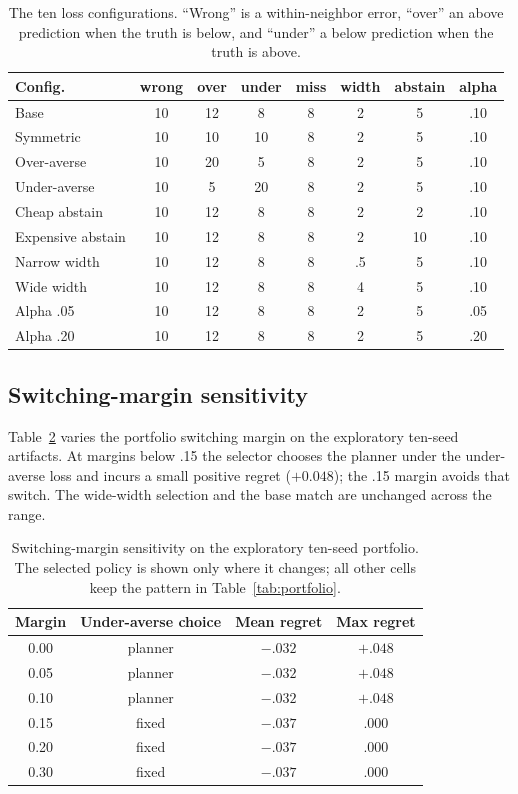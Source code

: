 \documentclass[11pt]{article}
\begin{document}
\begin{table}[t]
\centering
\scriptsize
\setlength{\tabcolsep}{1.5pt}
\begin{tabular}{lccccccc}
\toprule
Config. & wrong & over & under & miss & width & abstain & alpha \\
\midrule
Base & 10 & 12 & 8 & 8 & 2 & 5 & .10 \\
Symmetric & 10 & 10 & 10 & 8 & 2 & 5 & .10 \\
Over-averse & 10 & 20 & 5 & 8 & 2 & 5 & .10 \\
Under-averse & 10 & 5 & 20 & 8 & 2 & 5 & .10 \\
Cheap abstain & 10 & 12 & 8 & 8 & 2 & 2 & .10 \\
Expensive abstain & 10 & 12 & 8 & 8 & 2 & 10 & .10 \\
Narrow width & 10 & 12 & 8 & 8 & .5 & 5 & .10 \\
Wide width & 10 & 12 & 8 & 8 & 4 & 5 & .10 \\
Alpha .05 & 10 & 12 & 8 & 8 & 2 & 5 & .05 \\
Alpha .20 & 10 & 12 & 8 & 8 & 2 & 5 & .20 \\
\bottomrule
\end{tabular}
\caption{The ten loss configurations. ``Wrong'' is a within-neighbor error, ``over'' an above prediction when the truth is below, and ``under'' a below prediction when the truth is above.}
\label{tab:loss-grid}
\end{table}

\subsection{Switching-margin sensitivity}
\label{app:margin}
Table~\ref{tab:margin} varies the portfolio switching margin on the exploratory
ten-seed artifacts. At margins below .15 the selector chooses the planner under
the under-averse loss and incurs a small positive regret ($+0.048$); the .15
margin avoids that switch. The wide-width selection and the base match are
unchanged across the range.

\begin{table}[t]
\centering
\footnotesize
\setlength{\tabcolsep}{3pt}
\begin{tabular}{cccc}
\toprule
Margin & Under-averse choice & Mean regret & Max regret \\
\midrule
0.00 & planner & $-.032$ & $+.048$ \\
0.05 & planner & $-.032$ & $+.048$ \\
0.10 & planner & $-.032$ & $+.048$ \\
0.15 & fixed & $-.037$ & $.000$ \\
0.20 & fixed & $-.037$ & $.000$ \\
0.30 & fixed & $-.037$ & $.000$ \\
\bottomrule
\end{tabular}
\caption{Switching-margin sensitivity on the exploratory ten-seed portfolio. The selected policy is shown only where it changes; all other cells keep the pattern in Table~\ref{tab:portfolio}.}
\label{tab:margin}
\end{table}
\end{document}
